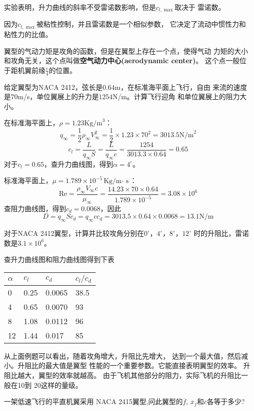 实验表明，升力曲线的斜率不受雷诺数影响，但是$c_{l,\max}$取决于
雷诺数。
\begin{notice}
	因为$c_{l,\max}$被粘性控制，并且雷诺数是一个相似参数，
	它决定了流动中惯性力和粘性力的比值。
\end{notice}

翼型的气动力矩是攻角的函数，但是在翼型上存在一个点，使得气动
力矩的大小和攻角无关，这个点叫做{\bfseries 空气动力中心(aerodynamic center)}。
这个点一般位于距机翼前缘$\frac{c}{4}$的位置。
\begin{example}
	给定翼型为NACA 2412，弦长是$0.64$m，在标准海平面上飞行，自由
	来流的速度是$70$m/s，单位翼展上的升力是$1254$N/m。计算飞行迎角
	和单位翼展上的阻力大小。


	在标准海平面上，$\rho=1.23\text{Kg/m}^3$：
	\[
		q_\infty =\frac{1}{2}\rho_\infty V_\infty ^2 =\frac{1}{2}\times 1.23\times 70^2=3013.5
		\text{N/m}^2
	\]
	\[
		c_l=\frac{L}{q_\infty S}=\frac{L}{q_\infty c}=\frac{1254}{3013.3\times 0.64}=0.65
	\]
	对于$c_l=0.65$，查升力曲线图，得到$\alpha=4^\circ$。

	标准海平面上，$\mu=1.789\times 10^{-5}\text{Kg/m$\cdot$ s}$：
	\[
		\mathrm{Re}=\frac{\rho_\infty V_\infty c }{\mu_\infty}=\frac{14.23\times 70\times 0.64}{1.789\times 10^{-5}}
		=3.08\times 10^6
	\]
	查阻力曲线图，得到$c_d=0.0068$，因此
	\[
		D=q_\infty S c_d=q_\infty c c_d=3013.5\times 0.64\times 0.0068=13.1\text{N/m}
	\]
\end{example}
\begin{example}
	对于NACA 2412翼型，计算并比较攻角分别在$0^\circ$，$4^\circ$，$8^\circ$，$12^\circ$
	时的升阻比，雷诺数是$3.1\times 10^6$。

	查升力曲线图和阻力曲线图得到下表

	\centering
	\begin{tabular}{llll}
		\toprule
		$\alpha$ & $c_l$ & $c_d$  & $c_l /c_d$ \\
		\midrule
		0        & 0.25  & 0.0065 & 38.5       \\
		4        & 0.65  & 0.0070 & 93         \\
		8        & 1.08  & 0.0112 & 96         \\
		12       & 1.44  & 0.017  & 85         \\
		\bottomrule
	\end{tabular}
\end{example}

从上面例题可以看出，随着攻角增大，升阻比先增大，
达到一个最大值，然后减小。升阻比的最大值是翼型
性能的一个重要参数。它能直接表明翼型的效率。
{\color{noteorange}升阻比越大，翼型的效率就越高}。
由于飞机其他部分的阻力，实际飞机的升阻比一般在10到
20这样的量级。
\begin{example}
一架低速飞行的平直机翼采用 NACA
2415翼型,问此翼型的$\overline{f}$,
$\overline{x}_{f}$和$\overline{c}$各等于多少?
    
\end{example}

